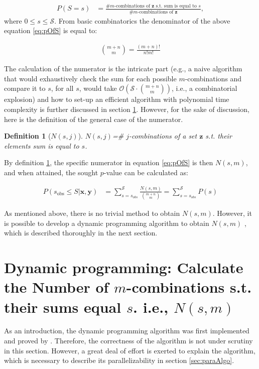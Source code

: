 \documentclass[a4paper]{article}
\newtheorem{mydef}{Definition}
\begin{document}
\begin{align}
\label{eq:pOfS}
P(S = s) &= \frac{\text{\# $m$-combinations of $\bm{z}$ s.t. sum is equal to $s$}}{\text{\# $m$-combinations of $\bm{z}$}}, 
\end{align}
where $0\leq s \leq \mathcal{S}$. From basic combinatorics the denominator of the above equation \ref{eq:pOfS} is equal to:

\begin{align*}
{m+n \choose m} = \frac{(m+n)!}{n!m!}
\end{align*}

The calculation of the numerator is the intricate part (e.g., a naive algorithm that would exhaustively check the sum for each possible $m$-combinations and compare it to $s$, for all $s$, would take $\mathcal{O}(\mathcal{S} \cdot {m+n \choose m})$, i.e., a combinatorial explosion) and how to set-up an efficient algorithm with polynomial time complexity is further discussed in section \ref{sec:calcBottleneck}. However, for the sake of discussion, here is the definition of the general case of the numerator.
\begin{mydef}[$N(s,j)$]
\label{def:numerator}
$N(s,j)$=\# $j$-combinations of a set $\bm{z}$ s.t. their elements sum is equal to $s$.
\end{mydef}

By definition \ref{def:numerator}, the specific numerator in equation \ref{eq:pOfS} is then $N(s,m)$, and when attained, the sought $p$-value can be calculated as:

\begin{align}
P(s_{\text{obs}} \leq S | \bm{x}, \bm{y}) &= \sum _{s=s_{obs}}^{\mathcal{S}}\frac{N(s,m)}{{m+n \choose m}}=\sum _{s=s_{obs}}^{\mathcal{S}}P(s)
\end{align}

As mentioned above, there is no trivial method to obtain $N(s,m)$. However, it is possible to develop a  dynamic programming algorithm to obtain $N(s,m)$ \cite{pagano_trichtler1983, zimmermann1985}, which is described thoroughly in the next section.

\section{Dynamic programming: Calculate the Number of $m$-combinations s.t. their sums equal $s$. i.e., $N(s,m)$}
\label{sec:calcBottleneck}

As an introduction, the dynamic programming algorithm was first implemented and proved by \cite{zimmermann1985, pagano_trichtler1983}. Therefore, the correctness of the algorithm is not under scrutiny in this section. However, a great deal of effort is exerted to explain the algorithm, which is necessary to describe its parallelizability in section \ref{sec:paraAlgo}.
\end{document}
